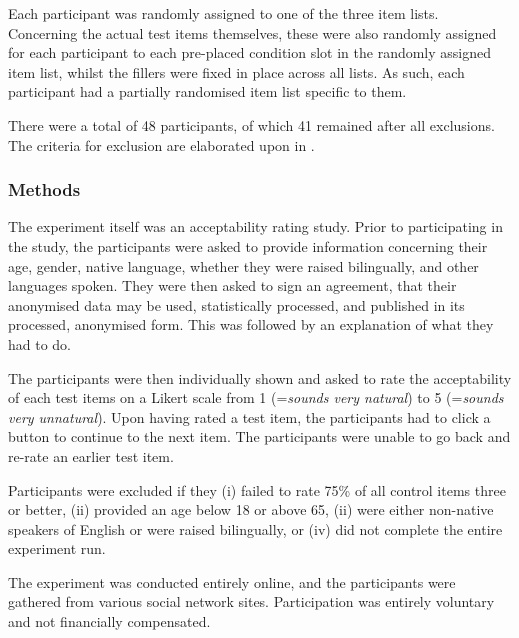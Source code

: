 Each participant was randomly assigned to one of the three item lists. Concerning the actual test items themselves, these were also randomly assigned for each participant to each pre-placed condition slot in the randomly assigned item list, whilst the fillers were fixed in place across all lists. As such, each participant had a partially randomised item list specific to them.

There were a total of 48 participants, of which 41 remained after all exclusions. The criteria for exclusion are elaborated upon in .


\subsubsection{Methods}
The experiment itself was an acceptability rating study. Prior to participating in the study, the participants were asked to provide information concerning their age, gender, native language, whether they were raised bilingually, and other languages spoken. They were then asked to sign an agreement, that their anonymised data may be used, statistically processed, and published in its processed, anonymised form. This was followed by an explanation of what they had to do.

The participants were then individually shown and asked to rate the acceptability of each test items on a Likert scale from 1 (=\textit{sounds very natural}) to 5 (=\textit{sounds very unnatural}). Upon having rated a test item, the participants had to click a button to continue to the next item. The participants were unable to go back and re-rate an earlier test item.

Participants were excluded if they (i) failed to rate 75\% of all control items three or better, (ii) provided an age below 18 or above 65, %
(ii) were either non-native speakers of English or were raised bilingually, or (iv) did not complete the entire experiment run.

The experiment was conducted entirely online, and the participants were gathered from various social network sites. Participation was entirely voluntary and not financially compensated.

